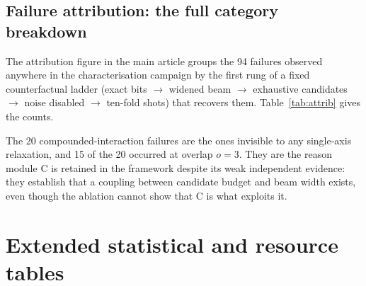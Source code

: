 \documentclass[preprint,11pt]{elsarticle}
\begin{document}
\subsection{Failure attribution: the full category breakdown}

The attribution figure in the main article groups the 94 failures
observed anywhere in the characterisation campaign by the first rung of a
fixed counterfactual ladder (exact bits $\to$ widened beam $\to$
exhaustive candidates $\to$ noise disabled $\to$ ten-fold shots) that
recovers them. Table~\ref{tab:attrib} gives the counts.

\begin{table}[h]
\centering\small
\caption{Root-cause attribution of all 94 naturally observed failures,
from \texttt{phase5\_attribution.csv}. The first two rows are the
classical-budget mechanisms that motivated the method.}
\label{tab:attrib}
\end{table}

The 20 compounded-interaction failures are the ones invisible to any
single-axis relaxation, and 15 of the 20 occurred at overlap $o=3$. They
are the reason module C is retained in the framework despite its weak
independent evidence: they establish that a coupling between candidate
budget and beam width exists, even though the ablation cannot show that C
is what exploits it.

\section{Extended statistical and resource tables}
\label{si:tables}
\end{document}
